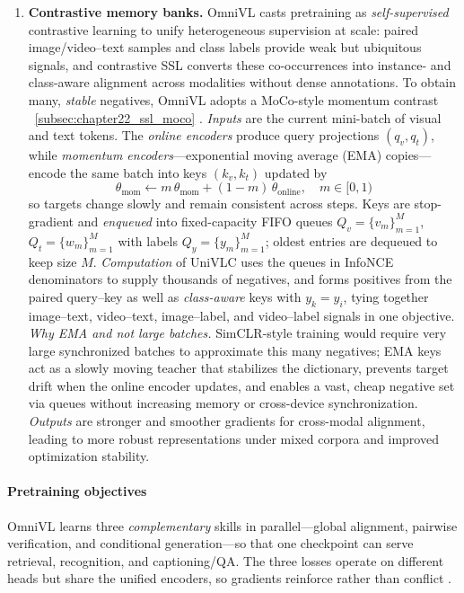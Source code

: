 \begin{enrichment}
\begin{enrichment}
\begin{enumerate}
            \item \textbf{Contrastive memory banks.} OmniVL casts pretraining as \emph{self-supervised} contrastive learning to unify heterogeneous supervision at scale: paired image/video–text samples and class labels provide weak but ubiquitous signals, and contrastive SSL converts these co-occurrences into instance- and class-aware alignment across modalities without dense annotations. To obtain many, \emph{stable} negatives, OmniVL adopts a MoCo-style momentum contrast ~\ref{subsec:chapter22_ssl_moco} \cite{wang2022_omnivl}. \emph{Inputs} are the current mini-batch of visual and text tokens. The \emph{online encoders} produce query projections \((q_v,q_t)\), while \emph{momentum encoders}—exponential moving average (EMA) copies—encode the same batch into keys \((k_v,k_t)\) updated by
            \[
            \theta_{\text{mom}} \leftarrow m\,\theta_{\text{mom}} + (1-m)\,\theta_{\text{online}},\quad m\in[0,1)
            \]
            so targets change slowly and remain consistent across steps. Keys are stop-gradient and \emph{enqueued} into fixed-capacity FIFO queues \(Q_v=\{v_m\}_{m=1}^{M}\), \(Q_t=\{w_m\}_{m=1}^{M}\) with labels \(Q_y=\{y_m\}_{m=1}^{M}\); oldest entries are dequeued to keep size \(M\). \emph{Computation} of UniVLC uses the queues in InfoNCE denominators to supply thousands of negatives, and forms positives from the paired query–key as well as \emph{class-aware} keys with \(y_k{=}y_i\), tying together image–text, video–text, image–label, and video–label signals in one objective. \emph{Why EMA and not large batches.} SimCLR-style training would require very large synchronized batches to approximate this many negatives; EMA keys act as a slowly moving teacher that stabilizes the dictionary, prevents target drift when the online encoder updates, and enables a vast, cheap negative set via queues without increasing memory or cross-device synchronization. \emph{Outputs} are stronger and smoother gradients for cross-modal alignment, leading to more robust representations under mixed corpora and improved optimization stability.
        \end{enumerate}
        
        \paragraph{Pretraining objectives}
        OmniVL learns three \emph{complementary} skills in parallel—global alignment, pairwise verification, and conditional generation—so that one checkpoint can serve retrieval, recognition, and captioning/QA. The three losses operate on different heads but share the unified encoders, so gradients reinforce rather than conflict \cite{wang2022_omnivl}.
        

\end{enrichment}
\end{enrichment}
